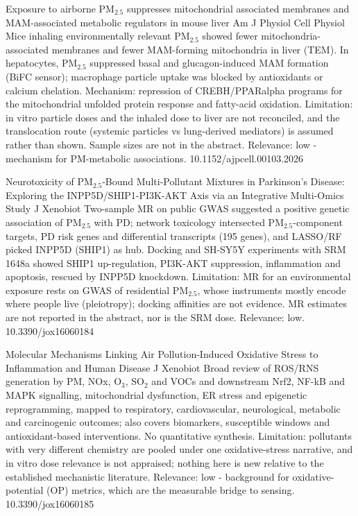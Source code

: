 \documentclass[10pt]{article}
\begin{document}
\par{}\baselineskip{}\baselineskip
{}

{Exposure to airborne PM$_{2.5}$ suppresses mitochondrial associated membranes and MAM-associated metabolic regulators in mouse liver}
{Am J Physiol Cell Physiol}
{Mice inhaling environmentally relevant PM$_{2.5}$ showed fewer mitochondria-associated membranes and fewer MAM-forming mitochondria in liver (TEM). In hepatocytes, PM$_{2.5}$ suppressed basal and glucagon-induced MAM formation (BiFC sensor); macrophage particle uptake was blocked by antioxidants or calcium chelation. Mechanism: repression of CREBH/PPARalpha programs for the mitochondrial unfolded protein response and fatty-acid oxidation. Limitation: in vitro particle doses and the inhaled dose to liver are not reconciled, and the translocation route (systemic particles vs lung-derived mediators) is assumed rather than shown. Sample sizes are not in the abstract. Relevance: low - mechanism for PM-metabolic associations.}
{10.1152/ajpcell.00103.2026}

{Neurotoxicity of PM$_{2.5}$-Bound Multi-Pollutant Mixtures in Parkinson's Disease: Exploring the INPP5D/SHIP1-PI3K-AKT Axis via an Integrative Multi-Omics Study}
{J Xenobiot}
{Two-sample MR on public GWAS suggested a positive genetic association of PM$_{2.5}$ with PD; network toxicology intersected PM$_{2.5}$-component targets, PD risk genes and differential transcripts (195 genes), and LASSO/RF picked INPP5D (SHIP1) as hub. Docking and SH-SY5Y experiments with SRM 1648a showed SHIP1 up-regulation, PI3K-AKT suppression, inflammation and apoptosis, rescued by INPP5D knockdown. Limitation: MR for an environmental exposure rests on GWAS of residential PM$_{2.5}$, whose instruments mostly encode where people live (pleiotropy); docking affinities are not evidence. MR estimates are not reported in the abstract, nor is the SRM dose. Relevance: low.}
{10.3390/jox16060184}

{Molecular Mechanisms Linking Air Pollution-Induced Oxidative Stress to Inflammation and Human Disease}
{J Xenobiot}
{Broad review of ROS/RNS generation by PM, NOx, O$_3$, SO$_2$ and VOCs and downstream Nrf2, NF-kB and MAPK signalling, mitochondrial dysfunction, ER stress and epigenetic reprogramming, mapped to respiratory, cardiovascular, neurological, metabolic and carcinogenic outcomes; also covers biomarkers, susceptible windows and antioxidant-based interventions. No quantitative synthesis. Limitation: pollutants with very different chemistry are pooled under one oxidative-stress narrative, and in vitro dose relevance is not appraised; nothing here is new relative to the established mechanistic literature. Relevance: low - background for oxidative-potential (OP) metrics, which are the measurable bridge to sensing.}
{10.3390/jox16060185}
\end{document}
